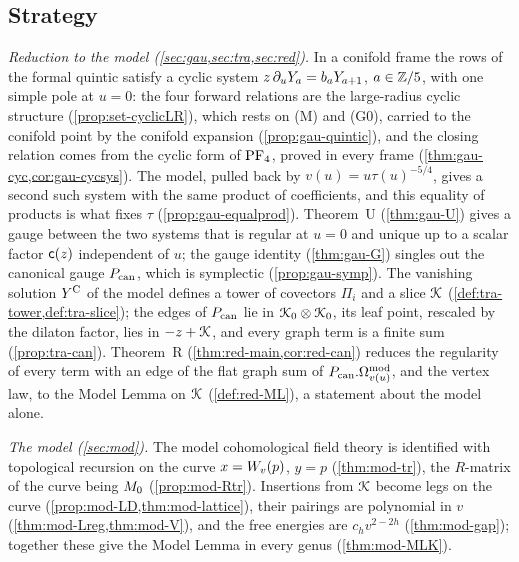 \subsection{Strategy}
\label{sec:int-strategy}

\emph{Reduction to the model (\cref{sec:gau,sec:tra,sec:red}).} In a conifold frame the rows of the formal quintic satisfy a cyclic system $z\,\partial_uY_a=b_aY_{a+1}$, $a\in\mathbb{Z}/5$, with one simple pole at $u=0$: the four forward relations are the large-radius cyclic structure (\cref{prop:set-cyclicLR}), which rests on (M) and (G0), carried to the conifold point by the conifold expansion (\cref{prop:gau-quintic}), and the closing relation comes from the cyclic form of $\mathrm{PF}_{4}$, proved in every frame (\cref{thm:gau-cyc,cor:gau-cycsys}). The model, pulled back by $v(u)=u\tau(u)^{-5/4}$, gives a second such system with the same product of coefficients, and this equality of products is what fixes $\tau$ (\cref{prop:gau-equalprod}). Theorem~U (\cref{thm:gau-U}) gives a gauge between the two systems that is regular at $u=0$ and unique up to a scalar factor $\mathsf{c}(z)$ independent of $u$; the gauge identity (\cref{thm:gau-G}) singles out the canonical gauge $P_{\mathrm{can}}$, which is symplectic (\cref{prop:gau-symp}). The vanishing solution $Y^{\mathrm{C}}$ of the model defines a tower of covectors $\Pi_i$ and a slice $\mathcal{K}$ (\cref{def:tra-tower,def:tra-slice}); the edges of $P_{\mathrm{can}}$ lie in $\mathcal{K}_{0}\otimes\mathcal{K}_{0}$, its leaf point, rescaled by the dilaton factor, lies in $-z+\mathcal{K}$, and every graph term is a finite sum (\cref{prop:tra-can}). Theorem~R (\cref{thm:red-main,cor:red-can}) reduces the regularity of every term with an edge of the flat graph sum of $P_{\mathrm{can}}.\Omega^{\mathrm{mod}}_{v(u)}$, and the vertex law, to the Model Lemma on $\mathcal{K}$ (\cref{def:red-ML}), a statement about the model alone.

\emph{The model (\cref{sec:mod}).} The model cohomological field theory is identified with topological recursion on the curve $x=W_{v}(p)$, $y=p$ (\cref{thm:mod-tr}), the $R$-matrix of the curve being $M_{0}$ (\cref{prop:mod-Rtr}). Insertions from $\mathcal{K}$ become legs on the curve (\cref{prop:mod-LD,thm:mod-lattice}), their pairings are polynomial in $v$ (\cref{thm:mod-Lreg,thm:mod-V}), and the free energies are $c_hv^{2-2h}$ (\cref{thm:mod-gap}); together these give the Model Lemma in every genus (\cref{thm:mod-MLK}).

